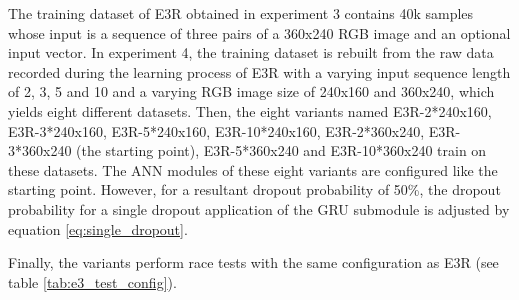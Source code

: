 The training dataset of E3R obtained in experiment 3
contains 40k samples 
whose input is a sequence of 
three pairs of a 360x240 RGB image 
and an optional input vector.
In experiment 4, 
the training dataset is rebuilt from the raw data
recorded during the learning process of E3R
with a varying input sequence length of 
2, 3, 5 and 10
and a varying RGB image size of 
240x160 and 360x240,
which yields eight different datasets.
Then, 
the eight variants
named 
E3R-2*240x160,
E3R-3*240x160,
E3R-5*240x160,
E3R-10*240x160,
E3R-2*360x240,
E3R-3*360x240 (the starting point),
E3R-5*360x240
and
E3R-10*360x240
train on these datasets.
The ANN modules of these eight variants
are configured like the starting point.
However, for a resultant dropout probability
of 50\%, the dropout probability
for a single dropout application of the GRU submodule
is adjusted by equation \ref{eq:single_dropout}.

Finally,
the variants perform
race tests with the same
configuration as E3R (see table \ref{tab:e3_test_config}).









